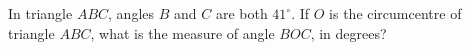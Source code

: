 In triangle $ABC$, angles $B$ and $C$ are both $41^\circ$. If $O$ is the circumcentre of triangle $ABC$, what is the measure of angle $BOC$, in degrees?
